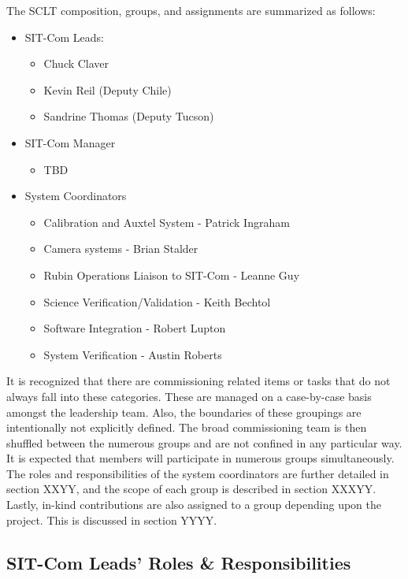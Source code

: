 \documentclass[SE,toc]{lsstdoc}
\begin{document}
The SCLT composition, groups, and assignments are summarized as follows:
\begin{itemize}
    \item SIT-Com Leads:
    \begin{itemize}
        \item Chuck Claver
        \item Kevin Reil (Deputy Chile)
        \item Sandrine Thomas (Deputy Tucson)
    \end{itemize}
    \item SIT-Com Manager
    \begin{itemize}
        \item TBD
    \end{itemize}
    \item System Coordinators
    \begin{itemize}
        \item Calibration and Auxtel System - Patrick Ingraham
        \item Camera systems - Brian Stalder
        \item Rubin Operations Liaison to SIT-Com - Leanne Guy
        \item Science Verification/Validation - Keith Bechtol
        \item Software Integration - Robert Lupton
        \item System Verification - Austin Roberts
    \end{itemize}
\end{itemize}


It is recognized that there are commissioning related items or tasks that do not always fall into these categories.
These are managed on a case-by-case basis amongst the leadership team.
Also, the boundaries of these groupings are intentionally not explicitly defined.
The broad commissioning team is then shuffled between the numerous groups and are not confined in any particular way.
It is expected that members will participate in numerous groups simultaneously.
The roles and responsibilities of the system coordinators are further detailed in section XXYY, and the scope of each group is described in section XXXYY.
Lastly, in-kind contributions are also assigned to a group depending upon the project.
This is discussed in section YYYY.

\subsection{SIT-Com Leads’ Roles \& Responsibilities}
\label{sec:r_and_rs}
\end{document}
